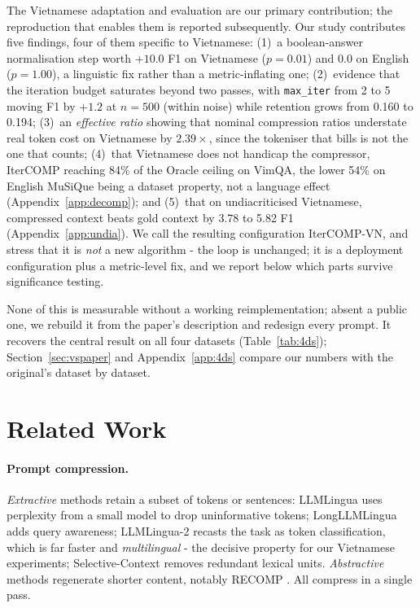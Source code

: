 \documentclass[11pt]{article}
\begin{document}
The Vietnamese adaptation and evaluation are our primary contribution; the
reproduction that enables them is reported subsequently. Our study contributes
five findings, four of them specific to Vietnamese:
(1)~a boolean-answer normalisation step worth $+10.0$ F1 on Vietnamese
($p=0.01$) and $0.0$ on English ($p=1.00$), a linguistic fix rather than a
metric-inflating one;
(2)~evidence that the iteration budget saturates beyond two passes, with
\texttt{max\_iter} from 2 to 5 moving F1 by $+1.2$ at $n=500$ (within noise)
while retention grows from 0.160 to 0.194;
(3)~an \emph{effective ratio} showing that nominal compression ratios understate
real token cost on Vietnamese by $2.39\times$, since the tokeniser that bills is
not the one that counts;
(4)~that Vietnamese does not handicap the compressor, IterCOMP reaching 84\% of
the Oracle ceiling on VimQA, the lower 54\% on English MuSiQue being a dataset
property, not a language effect (Appendix~\ref{app:decomp}); and
(5)~that on undiacriticised Vietnamese, compressed context beats gold context by
3.78 to 5.82 F1 (Appendix~\ref{app:undia}).
We call the resulting configuration IterCOMP-VN, and stress that it is \emph{not}
a new algorithm - the loop is unchanged; it is a deployment configuration plus a
metric-level fix, and we report below which parts survive significance testing.

None of this is measurable without a working reimplementation; absent a public
one, we rebuild it from the paper's description and redesign every prompt. It
recovers the central result on all four datasets (Table~\ref{tab:4ds});
Section~\ref{sec:vspaper} and Appendix~\ref{app:4ds} compare our numbers with the
original's dataset by dataset.

\section{Related Work}
\label{sec:related}

\paragraph{Prompt compression.} \emph{Extractive} methods retain a subset of tokens
or sentences: LLMLingua \citep{jiang2023llmlingua} uses perplexity from a small
model to drop uninformative tokens; LongLLMLingua
\citep{jiang2024longllmlingua} adds query awareness; LLMLingua-2
\citep{pan2024llmlingua2} recasts the task as token classification, which is far
faster and \emph{multilingual} - the decisive property for our Vietnamese
experiments; Selective-Context \citep{li2023selectivecontext} removes redundant
lexical units. \emph{Abstractive} methods regenerate shorter content, notably
RECOMP \citep{xu2024recomp}. All compress in a single pass.
\end{document}
